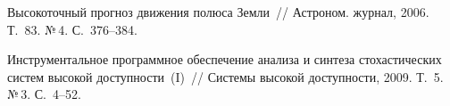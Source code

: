 \begin{multicols}{2}
{{\begin{thebibliography}{99}
Высокоточный прогноз движения полюса Земли~// Астроном. журнал, 2006. Т.~83. №\,4. С.~376--384.

\label{end\stat}

Инструментальное программное обеспечение анализа и синтеза стохастических систем высокой до\-ступ\-ности~(I)~// 
Системы высокой доступности, 2009. Т.~5. №\,3. С.~4--52.
 \end{thebibliography}
}
}
\end{multicols}